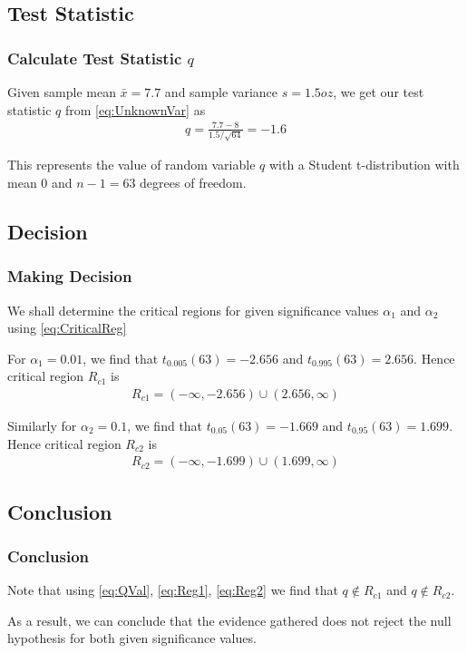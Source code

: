 \documentclass{beamer}
\begin{document}
\subsection{Test Statistic}
\begin{frame}
	\frametitle{Calculate Test Statistic $q$}
	Given sample mean $\bar{x} = 7.7$ and sample variance $s = 1.5 oz$, we get our test statistic $q$ from
	\eqref{eq:UnknownVar}
	as
	\begin{align}
		q = \frac{7.7 - 8}{1.5/\sqrt{64}} = -1.6
		\label{eq:QVal}
	\end{align}

	This represents the value of random variable $q$ with a Student t-distribution with mean $0$ and $n-1 = 63$ degrees of freedom.
\end{frame}

\subsection{Decision}
\begin{frame}
	\frametitle{Making Decision}
	We shall determine the critical regions for given significance values $\alpha_1$ and $\alpha_2$ using
	\eqref{eq:CriticalReg}

	For $\alpha_1 = 0.01$, we find that $t_{0.005}(63) = -2.656$ and $t_{0.995}(63) = 2.656$. Hence critical region $R_{c1}$ is
	\begin{align}
		R_{c1} = (-\infty, -2.656) \cup (2.656, \infty)
		\label{eq:Reg1}
	\end{align}

	Similarly for $\alpha_2 = 0.1$, we find that $t_{0.05}(63) = -1.669$ and $t_{0.95}(63) = 1.699$. Hence critical region $R_{c2}$ is
	\begin{align}
		R_{c2} = (-\infty, -1.699) \cup (1.699, \infty)
		\label{eq:Reg2}
	\end{align}
	
\end{frame}

\subsection{Conclusion}
\begin{frame}
	\frametitle{Conclusion}
	Note that using 
	\eqref{eq:QVal}, \eqref{eq:Reg1}, \eqref{eq:Reg2}
	we find that $q \notin R_{c1}$ and $q \notin R_{c2}$.

	As a result, we can conclude that the evidence gathered does not reject the null hypothesis for both given significance values.
\end{frame}
\end{document}
